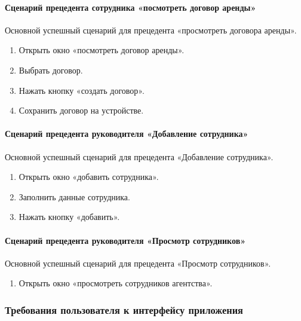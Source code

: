 \paragraph{Сценарий прецедента сотрудника «посмотреть договор аренды»}

Основной успешный сценарий для прецедента «просмотреть договора аренды».
\begin{enumerate}
\item	Открыть окно «посмотреть договор аренды».

\item	Выбрать договор.

\item	Нажать кнопку «создать договор».

\item	Сохранить договор на устройстве.
\end{enumerate}
\paragraph{Сценарий прецедента руководителя «Добавление сотрудника»}

Основной успешный сценарий для прецедента «Добавление сотрудника».
\begin{enumerate}
\item	Открыть окно «добавить сотрудника».

\item	Заполнить данные сотрудника.

\item	Нажать кнопку «добавить».
\end{enumerate}
\paragraph{Сценарий прецедента руководителя «Просмотр сотрудников»}

Основной успешный сценарий для прецедента «Просмотр сотрудников».
\begin{enumerate}
\item	Открыть окно «просмотреть сотрудников агентства».
\end{enumerate}

\subsubsection{Требования пользователя к интерфейсу приложения}

